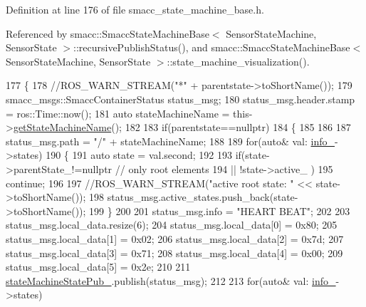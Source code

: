 Definition at line 176 of file smacc\+\_\+state\+\_\+machine\+\_\+base.\+h.



Referenced by smacc\+::\+Smacc\+State\+Machine\+Base$<$ Sensor\+State\+Machine, Sensor\+State $>$\+::recursive\+Publish\+Status(), and smacc\+::\+Smacc\+State\+Machine\+Base$<$ Sensor\+State\+Machine, Sensor\+State $>$\+::state\+\_\+machine\+\_\+visualization().


\begin{DoxyCode}
177     \{
178         \textcolor{comment}{//ROS\_WARN\_STREAM("*" + parentstate->toShortName());}
179         smacc\_msgs::SmaccContainerStatus status\_msg;
180         status\_msg.header.stamp = ros::Time::now();
181         \textcolor{keyword}{auto} stateMachineName = this->\hyperlink{classsmacc_1_1ISmaccStateMachine_a2d0b1742f17dd77d5df217153e8b5259}{getStateMachineName}();
182 
183         \textcolor{keywordflow}{if}(parentstate==\textcolor{keyword}{nullptr})
184         \{
185             
186 
187             status\_msg.path = \textcolor{stringliteral}{"/"} + stateMachineName;
188 
189             \textcolor{keywordflow}{for}(\textcolor{keyword}{auto}& val: \hyperlink{classsmacc_1_1ISmaccStateMachine_a5ec3201cbddab4f062f572fb33021041}{info\_}->states)
190             \{
191                 \textcolor{keyword}{auto} state = val.second;
192 
193                 \textcolor{keywordflow}{if}(state->parentState\_!=\textcolor{keyword}{nullptr} \textcolor{comment}{// only root elements}
194                     || !state->active\_ )
195                         \textcolor{keywordflow}{continue};     
196 
197                 \textcolor{comment}{//ROS\_WARN\_STREAM("active root state: " << state->toShortName());}
198                 status\_msg.active\_states.push\_back(state->toShortName());
199             \}
200 
201             status\_msg.info = \textcolor{stringliteral}{"HEART BEAT"};
202     
203             status\_msg.local\_data.resize(6);
204             status\_msg.local\_data[0] = 0x80;
205             status\_msg.local\_data[1] = 0x02;
206             status\_msg.local\_data[2] = 0x7d;
207             status\_msg.local\_data[3] = 0x71;
208             status\_msg.local\_data[4] = 0x00;
209             status\_msg.local\_data[5] = 0x2e;
210 
211             \hyperlink{structsmacc_1_1SmaccStateMachineBase_a7c76e7a7d6c00d9831472297ff51e38c}{stateMachineStatePub\_}.publish(status\_msg);
212 
213             \textcolor{keywordflow}{for}(\textcolor{keyword}{auto}& val: \hyperlink{classsmacc_1_1ISmaccStateMachine_a5ec3201cbddab4f062f572fb33021041}{info\_}->states)

\end{DoxyCode}
